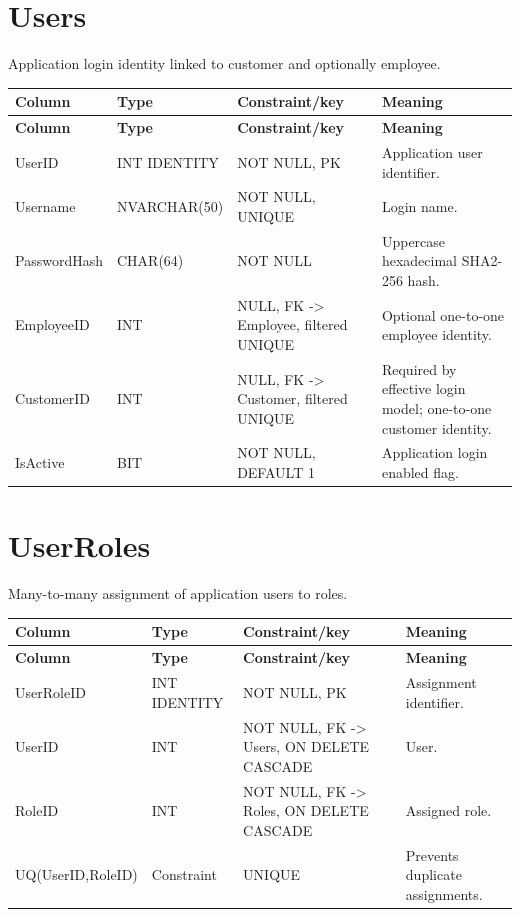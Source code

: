 \documentclass[11pt,a4paper,oneside]{report}
\begin{document}
\section{Users}
Application login identity linked to customer and optionally employee.
\begin{longtable}{L{0.21\textwidth}L{0.18\textwidth}L{0.24\textwidth}L{0.31\textwidth}}
\toprule
\textbf{Column} & \textbf{Type} & \textbf{Constraint/key} & \textbf{Meaning}\\
\midrule\endfirsthead
\toprule\textbf{Column} & \textbf{Type} & \textbf{Constraint/key} & \textbf{Meaning}\\\midrule\endhead
UserID & INT IDENTITY & NOT NULL, PK & Application user identifier.\\
Username & NVARCHAR(50) & NOT NULL, UNIQUE & Login name.\\
PasswordHash & CHAR(64) & NOT NULL & Uppercase hexadecimal SHA2-256 hash.\\
EmployeeID & INT & NULL, FK -> Employee, filtered UNIQUE & Optional one-to-one employee identity.\\
CustomerID & INT & NULL, FK -> Customer, filtered UNIQUE & Required by effective login model; one-to-one customer identity.\\
IsActive & BIT & NOT NULL, DEFAULT 1 & Application login enabled flag.\\
\bottomrule
\end{longtable}

\section{UserRoles}
Many-to-many assignment of application users to roles.
\begin{longtable}{L{0.21\textwidth}L{0.18\textwidth}L{0.24\textwidth}L{0.31\textwidth}}
\toprule
\textbf{Column} & \textbf{Type} & \textbf{Constraint/key} & \textbf{Meaning}\\
\midrule\endfirsthead
\toprule\textbf{Column} & \textbf{Type} & \textbf{Constraint/key} & \textbf{Meaning}\\\midrule\endhead
UserRoleID & INT IDENTITY & NOT NULL, PK & Assignment identifier.\\
UserID & INT & NOT NULL, FK -> Users, ON DELETE CASCADE & User.\\
RoleID & INT & NOT NULL, FK -> Roles, ON DELETE CASCADE & Assigned role.\\
UQ(UserID,RoleID) & Constraint & UNIQUE & Prevents duplicate assignments.\\
\bottomrule
\end{longtable}
\end{document}
